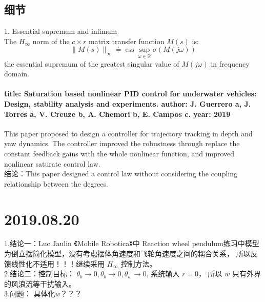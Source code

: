 \documentclass[UTF8,a4paper]{ctexart}
\begin{document}
\subsection{细节}
1. Essential supremum and infimum \\
The $H_\infty$ norm of the $c \times r$ matrix transfer function $M(s)$ is: 
\begin{equation}
\|M(s)\|_{\infty} \doteq \operatorname{ess} \sup _{\omega \in \mathbb{R}} \overline{\sigma}(M(j \omega))
\end{equation}
the essential supremum of the greatest singular value of $M(j \omega)$ in frequency domain.
\paragraph{title: Saturation based nonlinear PID control for underwater vehicles: Design,
stability analysis and experiments.  author: J. Guerrero a, J. Torres a, V. Creuze b, A. Chemori b, E. Campos c.  year: 2019}
This paper proposed to design a controller for trajectory tracking in depth and yaw dynamics. The controller improved the robustness through replace the constant feedback gains with the whole nonlinear function, and improved nonlinear saturate control law.\\
结论：This paper designed a control law without considering the coupling relationship between the degrees.\\
\section{2019.08.20}
1.结论一：Luc Jaulin 《Mobile Robotica》中 Reaction wheel pendulum练习中模型为倒立摆简化模型，没有考虑摆体角速度和飞轮角速度之间的耦合关系， 所以反馈线性化不适用！！！继续采用 $H_\infty$ 控制方法。\\
2.结论二：控制目标： $\theta_b \rightarrow 0, \dot{\theta_b} \rightarrow 0, \dot{\theta_w} \rightarrow 0$, 系统输入 $r = 0$， 所以 $w$ 只有外界的风浪流等干扰输入。\\
3.问题： 具体化$w$？？？\\
\end{document}

